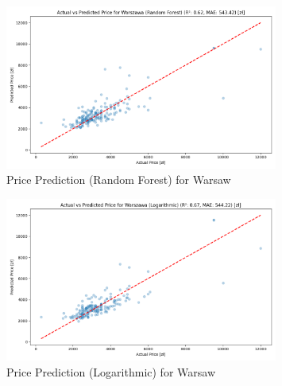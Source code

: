 \begin{figure}[H]
    \centering
    \includegraphics[width=0.8\textwidth]{figures/warsaw_price_prediction_rf.png}
    \caption{Price Prediction (Random Forest) for Warsaw}
\end{figure}
\begin{figure}[H]
    \centering
    \includegraphics[width=0.8\textwidth]{figures/warsaw_price_prediction_logarithmic.png}
    \caption{Price Prediction (Logarithmic) for Warsaw}
\end{figure}

